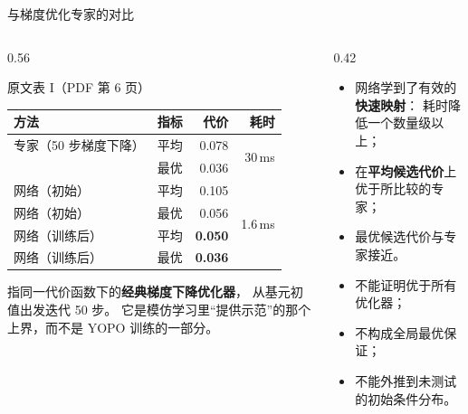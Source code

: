 \begin{frame}{与梯度优化专家的对比}
  \small
  \begin{columns}[t]
    \begin{column}{0.56\textwidth}
      \begin{block}{原文表 I（PDF 第 6 页）}
        \footnotesize
        \begin{tabular}{@{}llrr@{}}
          \toprule
          方法 & 指标 & 代价 & 耗时 \\
          \midrule
          专家（50 步梯度下降） & 平均 & 0.078 & \multirow{2}{*}{30\,ms} \\
                                & 最优 & 0.036 & \\
          \addlinespace
          网络（初始） & 平均 & 0.105 & \multirow{4}{*}{1.6\,ms} \\
          网络（初始） & 最优 & 0.056 & \\
          网络（训练后） & 平均 & \textbf{0.050} & \\
          网络（训练后） & 最优 & \textbf{0.036} & \\
          \bottomrule
        \end{tabular}
      \end{block}
      \begin{reading}[“专家”的含义]
        \scriptsize
        指同一代价函数下的\textbf{经典梯度下降优化器}，
        从基元初值出发迭代 50 步。
        它是模仿学习里“提供示范”的那个上界，而不是 YOPO 训练的一部分。
      \end{reading}
    \end{column}
    \begin{column}{0.42\textwidth}
      \begin{reading}[结论适用范围]
        \small
        \begin{itemize}\tight
          \item 网络学到了有效的\textbf{快速映射}：
                耗时降低一个数量级以上；
          \item 在\textbf{平均候选代价}上优于所比较的专家；
          \item 最优候选代价与专家接近。
        \end{itemize}
      \end{reading}
      \begin{reading}[结论的边界]
        \small
        \begin{itemize}\tight
          \item 不能证明优于所有优化器；
          \item 不构成全局最优保证；
          \item 不能外推到未测试的初始条件分布。
        \end{itemize}
      \end{reading}
    \end{column}
  \end{columns}
\end{frame}

